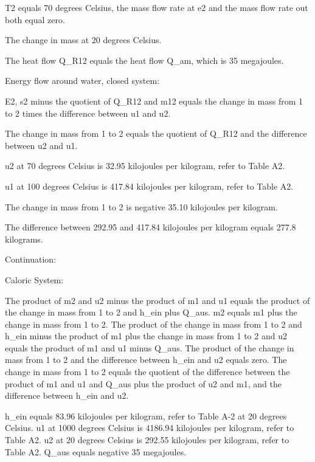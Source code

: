 T2 equals 70 degrees Celsius, the mass flow rate at e2 and the mass flow rate out both equal zero.

The change in mass at 20 degrees Celsius.

The heat flow Q_R12 equals the heat flow Q_am, which is 35 megajoules.

Energy flow around water, closed system:

E2, s2 minus the quotient of Q_R12 and m12 equals the change in mass from 1 to 2 times the difference between u1 and u2.

The change in mass from 1 to 2 equals the quotient of Q_R12 and the difference between u2 and u1.

u2 at 70 degrees Celsius is 32.95 kilojoules per kilogram, refer to Table A2.

u1 at 100 degrees Celsius is 417.84 kilojoules per kilogram, refer to Table A2.

The change in mass from 1 to 2 is negative 35.10 kilojoules per kilogram.

The difference between 292.95 and 417.84 kilojoules per kilogram equals 277.8 kilograms.

Continuation:

Caloric System:

The product of m2 and u2 minus the product of m1 and u1 equals the product of the change in mass from 1 to 2 and h_ein plus Q_aus. m2 equals m1 plus the change in mass from 1 to 2. The product of the change in mass from 1 to 2 and h_ein minus the product of m1 plus the change in mass from 1 to 2 and u2 equals the product of m1 and u1 minus Q_aus. The product of the change in mass from 1 to 2 and the difference between h_ein and u2 equals zero. The change in mass from 1 to 2 equals the quotient of the difference between the product of m1 and u1 and Q_aus plus the product of u2 and m1, and the difference between h_ein and u2.

h_ein equals 83.96 kilojoules per kilogram, refer to Table A-2 at 20 degrees Celsius. u1 at 1000 degrees Celsius is 4186.94 kilojoules per kilogram, refer to Table A2. u2 at 20 degrees Celsius is 292.55 kilojoules per kilogram, refer to Table A2. Q_aus equals negative 35 megajoules.